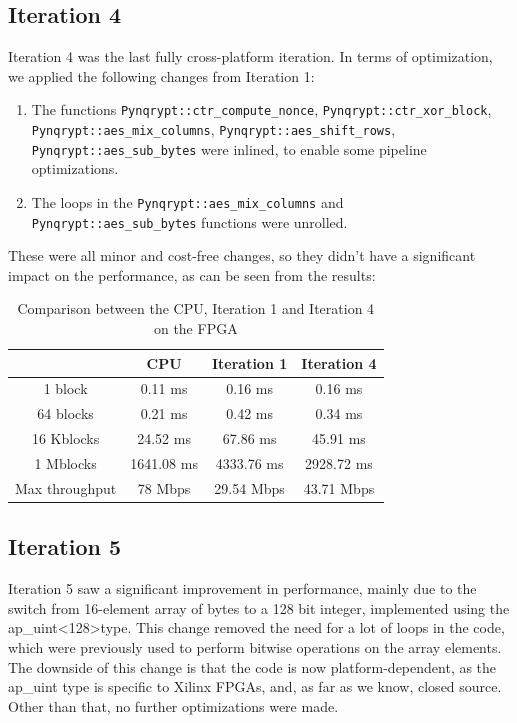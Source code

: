 \documentclass[12pt,oneside,a4paper]{article}
\begin{document}
\subsection{Iteration 4} \label{subsec:iter4}
Iteration 4 was the last fully cross-platform iteration.
In terms of optimization, we applied the following changes from Iteration 1:
\begin{enumerate}
	\item The functions {\tt Pynqrypt::ctr\_compute\_nonce}, {\tt Pynqrypt::ctr\_xor\_block}, {\tt Pynqrypt::aes\_mix\_columns}, {\tt Pynqrypt::aes\_shift\_rows}, \\ {\tt Pynqrypt::aes\_sub\_bytes} were inlined, to enable some pipeline optimizations.
	\item The loops in the {\tt Pynqrypt::aes\_mix\_columns} and {\tt Pynqrypt::aes\_sub\_bytes} functions were unrolled.
\end{enumerate}

These were all minor and cost-free changes, so they didn't have a significant impact on the performance, as can be seen from the results:
\begin{table}[h!]
	\centering
	\begin{tabular}{cccc}
		\toprule
		 & CPU & Iteration 1 & Iteration 4 \\
		\midrule
		1 block & 0.11 ms & 0.16 ms & 0.16 ms \\
		64 blocks & 0.21 ms & 0.42 ms & 0.34 ms \\
		16 Kblocks & 24.52 ms & 67.86 ms & 45.91 ms \\
		1 Mblocks & 1641.08 ms & 4333.76 ms & 2928.72 ms \\
		Max throughput & 78 Mbps & 29.54 Mbps & 43.71 Mbps \\
		\bottomrule
	\end{tabular}
	\caption{Comparison between the CPU, Iteration 1 and Iteration 4 on the FPGA}
\end{table}

\subsection{Iteration 5} \label{subsec:iter5}
Iteration 5 saw a significant improvement in performance, mainly due to the switch from 16-element array of bytes to a 128 bit integer, implemented using the ap\_uint\textless128\textgreater type.
This change removed the need for a lot of loops in the code, which were previously used to perform bitwise operations on the array elements.
The downside of this change is that the code is now platform-dependent, as the ap\_uint type is specific to Xilinx FPGAs, and, as far as we know, closed source. Other than that, no further optimizations were made.
\end{document}
